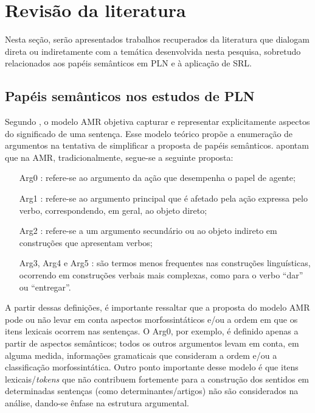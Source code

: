 \section{Revisão da literatura}\label{sec-revisão}

Nesta seção, serão apresentados trabalhos recuperados da literatura que
dialogam direta ou indiretamente com a temática desenvolvida nesta
pesquisa, sobretudo relacionados aos papéis semânticos em PLN e à
aplicação de SRL.

\subsection{Papéis semânticos nos estudos de PLN}\label{sub-sec-papeissemanticos}

Segundo \textcite{banarescu2013}, o modelo AMR objetiva capturar e
representar explicitamente aspectos do significado de uma sentença. Esse
modelo teórico propõe a enumeração de argumentos na tentativa de
simplificar a proposta de papéis semânticos. \textcite{weischedel2013} apontam que na AMR, tradicionalmente, segue-se a seguinte
proposta:

\begin{itemize}
\item[Arg0]\label{arg0}: refere-se ao argumento da ação que desempenha o papel de agente;
\item[Arg1]\label{arg1}: refere-se ao argumento principal que é afetado pela ação
  expressa pelo verbo, correspondendo, em geral, ao objeto direto;
\item[Arg2]\label{arg2}: refere-se a um argumento secundário ou ao objeto indireto em
  construções que apresentam verbos;
\item[Arg3, Arg4 e Arg5]\label{arg345}: são termos menos frequentes nas construções
  linguísticas, ocorrendo em construções verbais mais complexas, como
  para o verbo ``dar'' ou ``entregar''.
\end{itemize}

A partir dessas definições, é importante ressaltar que a proposta do
modelo AMR pode ou não levar em conta aspectos morfossintáticos e/ou a
ordem em que os itens lexicais ocorrem nas sentenças. O Arg0, por
exemplo, é definido apenas a partir de aspectos semânticos; todos os
outros argumentos levam em conta, em alguma medida, informações
gramaticais que consideram a ordem e/ou a classificação morfossintática.
Outro ponto importante desse modelo é que itens lexicais/\emph{tokens}
que não contribuem fortemente para a construção dos sentidos em
determinadas sentenças (como determinantes/artigos) não são considerados
na análise, dando-se ênfase na estrutura argumental.

